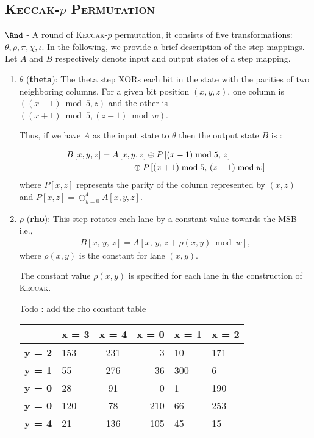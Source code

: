 \documentclass[runningheads]{llncs}
\newcommand{\KECCAK}{\mbox{\textsc{Keccak}}}
\newcommand{\Keccak}{\mbox{\textsc{Keccak}}}
\begin{document}
\subsection*{\textsc{\Keccak-$p$ Permutation}}
$\Rnd$ \;- A round of \KECCAK-$p$ permutation, it consists of five transformations: {$\theta,\rho,\pi,\chi,\iota$}. 
In the following, we provide a brief description of the step mappings.
 Let $A$ and $B$ respectively denote input and output states of a step mapping.
\begin{enumerate}
    \item $\theta$ ({\bf theta}): The theta step XORs each bit in the state with the parities of two neighboring columns. For a given bit position $(x, y, z)$, one column is $((x - 1) \bmod 5, z) $ and the other is $((x+1)\bmod 5, (z - 1) \bmod w)$. 
    
    Thus, if we have $A$ as the input state to $\theta$ then the output state $B$ is :
    
    \begin{align}\nonumber
        B\left[x, y, z\right] &= A\left[x, y, z\right] \oplus P\left[ (x - 1) \bmod 5 ,\, z \right] \\
        &\hspace{1.3cm}\oplus P\left[ (x + 1) \bmod 5 ,\, (z - 1) \bmod w \right]
    \end{align}
    where $P[x, z]$ represents the parity of the column represented by $(x, z)$ and $P[x, z]  = \oplus_{y = 0}^{4} A[x, y, z] $.
    \vskip5pt
    \item $\rho$ ({\bf rho}): This step rotates each lane by a constant value towards the MSB i.e., 
    \begin{align}
        B[x, \,y,\, z] = A[x, \,y, \,z + \rho(x, y) \bmod w ],
    \end{align}
    where $\rho(x, y)$ is the constant for lane $(x, y)$. 
    
		The constant value $\rho(x, y)$ is specified for each lane in the construction of \Keccak{}. 
		
		Todo : add the rho constant table
		\begin{table}[h!]
			\begin{center}
				\label{tab:table1}
				\begin{tabular}{l|l|S|r|l|l}
					 & \textbf{x = 3} & \textbf{x = 4} & \textbf{x = 0} & \textbf{x = 1} & \textbf{x = 2}\\ %
					\hline
					\textbf{y = 2} & 153 & 231 & 3 & 10 & 171\\ %
					\hline
					\textbf{y = 1} & 55 & 276 & 36 & 300 & 6\\ %
					\hline
					\textbf{y = 0} & 28 & 91 & 0 & 1 & 190\\ %
					\hline
					\textbf{y = 0} & 120 & 78 & 210 & 66 & 253\\ %
					\hline
					\textbf{y = 4} & 21 & 136 & 105 & 45 & 15\\ %
					\hline
				\end{tabular}
			\end{center}
		\end{table}



\end{enumerate}
\end{document}
